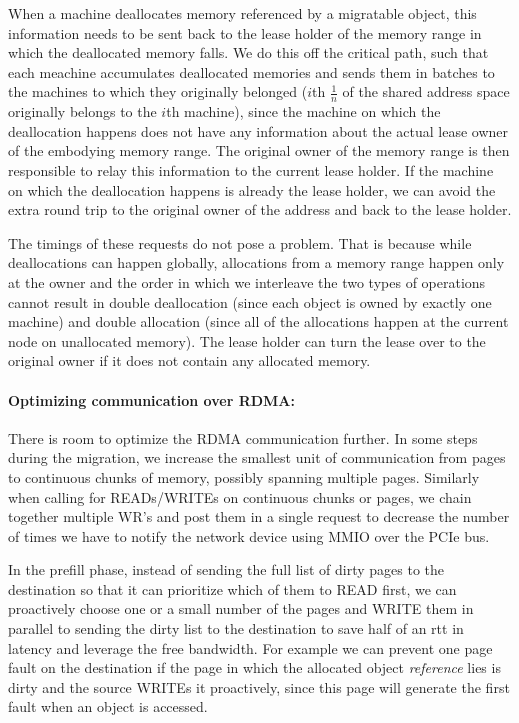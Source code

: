 When a machine deallocates memory referenced by a migratable object, this
information needs to be sent back to the lease holder of the memory range in
which the deallocated memory falls. We do this off the critical path, such that
each meachine accumulates deallocated memories and sends them in batches to
the machines to which they originally belonged ($i$th $\frac{1}{n}$ of the
shared address space originally belongs to the $i$th machine), since the machine
on which the
deallocation happens does not have any information about
the actual lease owner of the embodying memory range. The original owner
of the memory range is then responsible to relay this information to the current
lease holder. If the machine on which the deallocation happens is already the
lease holder, we can avoid the extra round trip to the original owner of the
address and back to the lease holder.

The timings of these requests do not pose a problem. That is
because while deallocations can happen globally, allocations from a memory range
happen only at the owner and the order in which we interleave the two types of
operations cannot result in double deallocation (since each object is owned by
exactly one machine) and double allocation (since all of the allocations happen
at the current node on unallocated memory). The lease holder can turn the lease
over to the original owner if it does not contain any allocated memory.

\paragraph{Optimizing communication over RDMA:} There is room to optimize
the RDMA communication further. In some steps during the migration, we
increase the smallest unit of communication from pages to continuous chunks
of memory, possibly spanning multiple pages. Similarly when calling for
READs/WRITEs on continuous chunks or pages, we chain together multiple
WR's and post them in a single request to decrease the number of times we
have to notify the network device using MMIO over the PCIe bus.

In the prefill phase, instead of sending the full list of dirty pages to the
destination so that it can prioritize which of them to READ first, we can
proactively choose one or a small number of the pages and WRITE them in
parallel to sending the dirty list to the destination to save half of an rtt
in latency and leverage the free bandwidth.
For example we can prevent one page fault on the destination
if the page in which the allocated object \emph{reference} lies is dirty and
the source WRITEs it proactively, since this page will generate the first
fault when an object is accessed.


